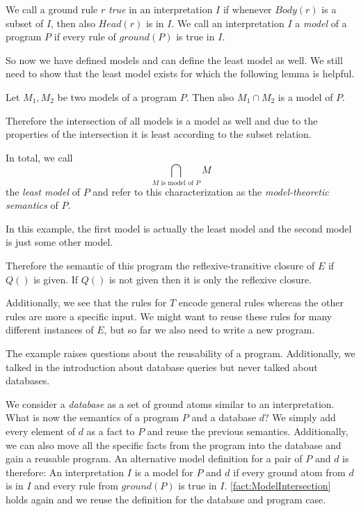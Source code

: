 We call a ground rule $r$ \textit{true} in an interpretation $I$ if whenever $Body(r)$ is a subset of $I$, then also $Head(r)$ is in $I$.  We call an interpretation $I$ a \textit{model} of a program $P$ if every rule of $ground(P)$ is true in $I$.

So now we have defined models and can define the least model as well. We still need to show that the least model exists for which the following lemma is helpful.

\begin{fact}\label{fact:ModelIntersection}
Let $M_1, M_2$ be two models of a program $P$. Then also $M_1 \cap M_2$ is a model of $P$.
\end{fact}

Therefore the intersection of all models is a model as well and due to the properties of the intersection it is least according to the subset relation. 

In total, we call \[\bigcap_{\text{$M$ is model of $P$}} M\] the \textit{least model} of $P$ and refer to this characterization as the \textit{model-theoretic semantics} of $P$.

\begin{contexample}
    In this example, the first model is actually the least model and the second model is just some other model.

    Therefore the semantic of this program the reflexive-transitive closure of $E$ if $Q()$ is given.
    If $Q()$ is not given then it is only the reflexive closure.

    Additionally, we see that the rules for $T$ encode general rules whereas the other rules are more a specific input. We might want to reuse these rules for many different instances of $E$, but so far we also need to write a new program.
\end{contexample}

The example raises questions about the reusability of a program. Additionally, we talked in the introduction about database queries but never talked about databases. 

We consider a \textit{database} as a set of ground atoms similar to an interpretation. What is now the semantics of a program $P$ and a database $d$? We simply add every element of $d$ as a fact to $P$ and reuse the previous semantics. Additionally, we can also move all the specific facts from the program into the database and gain a reusable program.
An alternative model definition for a pair of $P$ and $d$ is therefore: An interpretation $I$ is a model for $P$ and $d$ if every ground atom from $d$ is in $I$ and every rule from $ground(P)$ is true in $I$. \cref{fact:ModelIntersection} holds again and we reuse the definition for the database and program case.

